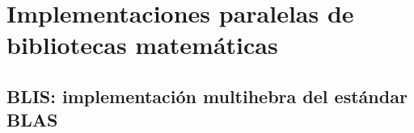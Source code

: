 %


\section{Implementaciones paralelas de bibliotecas matemáticas}
\label{sec:bibliotecas}

\subsection{BLIS: implementación multihebra del estándar BLAS}

